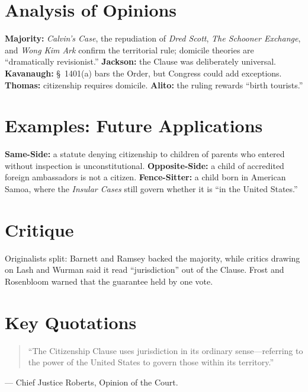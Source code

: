 \documentclass[12pt]{article}
\begin{document}
\section{Analysis of Opinions}
\textbf{Majority:} \textit{Calvin's Case}, the repudiation of \textit{Dred Scott}, \textit{The Schooner Exchange}, and \textit{Wong Kim Ark} confirm the territorial rule; domicile theories are ``dramatically revisionist.'' \textbf{Jackson:} the Clause was deliberately universal. \textbf{Kavanaugh:} \S\ 1401(a) bars the Order, but Congress could add exceptions. \textbf{Thomas:} citizenship requires domicile. \textbf{Alito:} the ruling rewards ``birth tourists.''

\section{Examples: Future Applications}
\textbf{Same-Side:} a statute denying citizenship to children of parents who entered without inspection is unconstitutional. \textbf{Opposite-Side:} a child of accredited foreign ambassadors is not a citizen. \textbf{Fence-Sitter:} a child born in American Samoa, where the \textit{Insular Cases} still govern whether it is ``in the United States.''

\section{Critique}
Originalists split: Barnett and Ramsey backed the majority, while critics drawing on Lash and Wurman said it read ``jurisdiction'' out of the Clause. Frost and Rosenbloom warned that the guarantee held by one vote.

\section{Key Quotations}
\begin{quote}
``The Citizenship Clause uses jurisdiction in its ordinary sense---referring to the power of the United States to govern those within its territory.''
\end{quote}
\noindent --- Chief Justice Roberts, Opinion of the Court.
\end{document}
